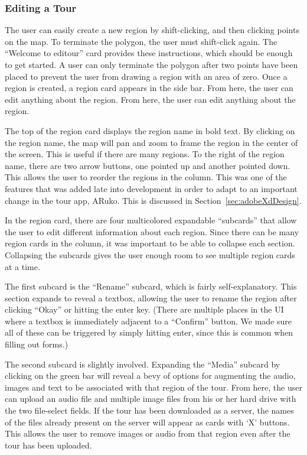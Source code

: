 \documentclass[a4paper, 10pt, american, titlepage]{article}
\begin{document}
\subsubsection{Editing a Tour}
\label{sec:editingATour}

The user can easily create a new region by shift-clicking, and then clicking
points on the map.  To terminate the polygon, the user must shift-click again.
The ``Welcome to editour'' card provides these instructions, which should be
enough to get started.  A user can only terminate the polygon after two points
have been placed to prevent the user from drawing a region with an area of
zero. Once a region is created, a region card appears in the side bar. From
here, the user can edit anything about the region. From here, the user can edit
anything about the region.

The top of the region card displays the region name in bold text. By clicking
on the region name, the map will pan and zoom to frame the region in the center
of the screen. This is useful if there are many regions. To the right of the
region name, there are two arrow buttons, one pointed up and another pointed
down. This allows the user to reorder the regions in the column. This was one
of the features that was added late into development in order to adapt to an
important change in the tour app, ARuko. This is discussed in
Section~\ref{sec:adobeXdDesign}.

In the region card, there are four multicolored expandable ``subcards'' that
allow the user to edit different information about each region. Since there can
be many region cards in the column, it was important to be able to collapse
each section. Collapsing the subcards gives the user enough room to see
multiple region cards at a time.

The first subcard is the ``Rename'' subcard, which is fairly self-explanatory.
This section expands to reveal a textbox, allowing the user to rename the
region after clicking ``Okay'' or hitting the enter key. (There are multiple
places in the UI where a textbox is immediately adjacent to a ``Confirm''
button.  We made sure all of these can be triggered by simply hitting enter,
since this is common when filling out forms.)

The second subcard is slightly involved. Expanding the ``Media'' subcard by
clicking on the green bar will reveal a bevy of options for augmenting the
audio, images and text to be associated with that region of the tour. From
here, the user can upload an audio file and multiple image files from his or
her hard drive with the two file-select fields. If the tour has been downloaded
as a server, the names of the files already present on the server will appear
as cards with `X' buttons. This allows the user to remove images or audio from
that region even after the tour has been uploaded.
\end{document}
